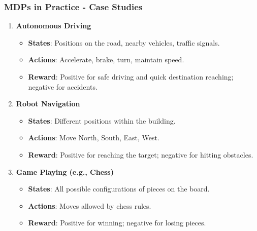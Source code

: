 \documentclass[aspectratio=169]{beamer}
\begin{document}
\begin{frame}[fragile]
    \frametitle{MDPs in Practice - Case Studies}
    \begin{enumerate}
        \item \textbf{Autonomous Driving}
            \begin{itemize}
                \item \textbf{States}: Positions on the road, nearby vehicles, traffic signals.
                \item \textbf{Actions}: Accelerate, brake, turn, maintain speed.
                \item \textbf{Reward}: Positive for safe driving and quick destination reaching; negative for accidents.
            \end{itemize}
        \item \textbf{Robot Navigation}
            \begin{itemize}
                \item \textbf{States}: Different positions within the building.
                \item \textbf{Actions}: Move North, South, East, West.
                \item \textbf{Reward}: Positive for reaching the target; negative for hitting obstacles.
            \end{itemize}
        \item \textbf{Game Playing (e.g., Chess)}
            \begin{itemize}
                \item \textbf{States}: All possible configurations of pieces on the board.
                \item \textbf{Actions}: Moves allowed by chess rules.
                \item \textbf{Reward}: Positive for winning; negative for losing pieces.
            \end{itemize}
    \end{enumerate}
\end{frame}
\end{document}
